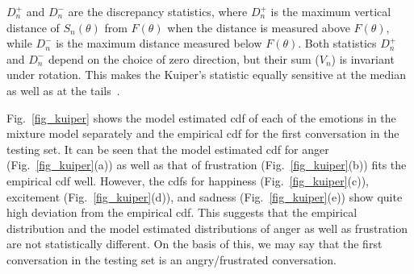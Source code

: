 \documentclass[10pt,journal,cspaper,compsoc]{IEEEtran}
\begin{document}
$D_{n}^{+}$ and $D_{n}^{-}$ are the discrepancy statistics, where $D_{n}^{+}$ is the maximum vertical distance of $S_{n}(\theta)$ from $F(\theta)$ when the distance is measured above $F(\theta)$, while $D_{n}^{-}$ is the maximum distance measured below $F(\theta)$. Both statistics $D_{n}^{+}$ and $D_{n}^{-}$ depend on the choice of zero direction, but their sum ($V_{n}$) is invariant under rotation. This makes the Kuiper's statistic equally sensitive at the median as well as at the tails~\cite{kuiper1960tests, mardia1972statistics}.

Fig.~\ref{fig_kuiper} shows the model estimated cdf of each of the emotions in the mixture model separately and the empirical cdf for the first conversation in the testing set. It can be seen that the model estimated cdf for anger (Fig.~\ref{fig_kuiper}(a)) as well as that of frustration (Fig.~\ref{fig_kuiper}(b)) fits the empirical cdf well. However, the cdfs for happiness (Fig.~\ref{fig_kuiper}(c)), excitement (Fig.~\ref{fig_kuiper}(d)), and sadness (Fig.~\ref{fig_kuiper}(e)) show quite high deviation from the empirical cdf. This suggests that the empirical distribution and the model estimated distributions of anger as well as frustration are not statistically different. On the basis of this, we may say that the first conversation in the testing set is an angry/frustrated conversation.
\end{document}
